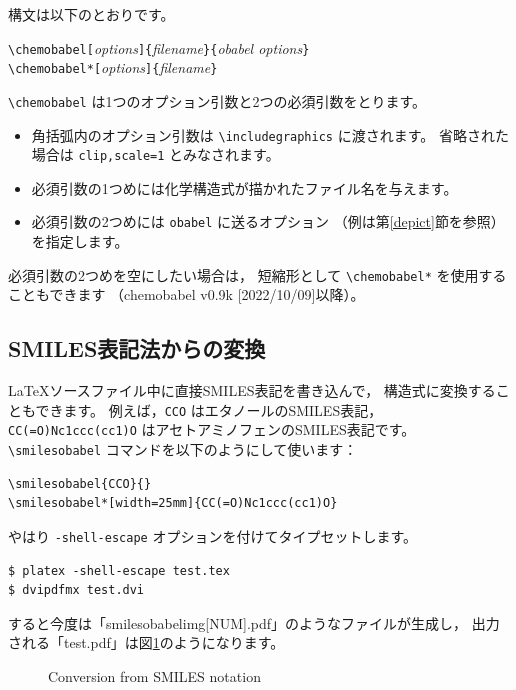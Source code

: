 \documentclass[12pt]{ltjsarticle}
\def\Lpack#1{\textsf{#1}}
\def\Lmeta#1{\textit{#1}}
\def\Lver#1{\Lpack{chemobabel} #1}
\begin{document}
構文は以下のとおりです。
\begin{center}
\verb|\chemobabel[|\Lmeta{options}\verb|]{|\Lmeta{filename}\verb|}{|\Lmeta{obabel options}\verb|}| \\
\verb|\chemobabel*[|\Lmeta{options}\verb|]{|\Lmeta{filename}\verb|}|
\end{center}
\verb|\chemobabel| は1つのオプション引数と2つの必須引数をとります。
\begin{itemize}
 \item 角括弧内のオプション引数は \verb|\includegraphics| に渡されます。
   省略された場合は \verb|clip,scale=1| とみなされます。
 \item 必須引数の1つめには化学構造式が描かれたファイル名を与えます。
 \item 必須引数の2つめには \verb|obabel| に送るオプション
   （例は第\ref{depict}節を参照）を指定します。
\end{itemize}
必須引数の2つめを空にしたい場合は，
短縮形として \verb|\chemobabel*| を使用することもできます
（\Lver{v0.9k [2022/10/09]}以降）。

\subsection{SMILES表記法からの変換}

\LaTeX ソースファイル中に直接SMILES表記を書き込んで，
構造式に変換することもできます。
例えば，\verb|CCO| はエタノールのSMILES表記，
\verb|CC(=O)Nc1ccc(cc1)O| はアセトアミノフェンのSMILES表記です。
\verb|\smilesobabel| コマンドを以下のようにして使います：

\begin{verbatim}
\smilesobabel{CCO}{}
\smilesobabel*[width=25mm]{CC(=O)Nc1ccc(cc1)O}
\end{verbatim}

やはり \verb|-shell-escape| オプションを付けてタイプセットします。
\begin{verbatim}
$ platex -shell-escape test.tex
$ dvipdfmx test.dvi
\end{verbatim}
すると今度は「smilesobabelimg[NUM].pdf」のようなファイルが生成し，
出力される「test.pdf」は図\ref{fig:smi1}のようになります。
\begin{figure}[h]
  \centering
   \quad
  \caption{Conversion from SMILES notation}\label{fig:smi1}
\end{figure}
\end{document}
